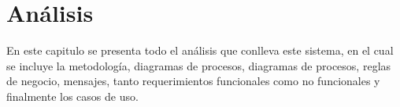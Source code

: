 \chapter{Análisis}
En este capitulo se presenta todo el análisis que conlleva este sistema, en el cual se incluye la metodología, diagramas de procesos, diagramas de procesos, reglas de negocio, mensajes, tanto requerimientos funcionales como no funcionales y finalmente los casos de uso. 
    
    
    
    
    
    
    